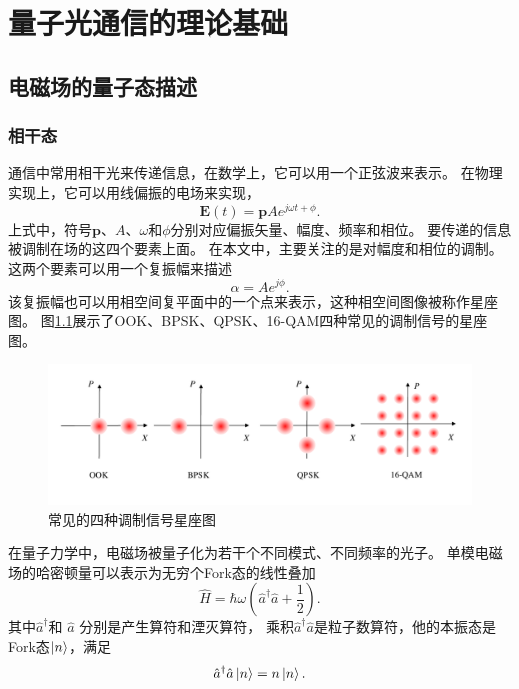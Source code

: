 \chapter{量子光通信的理论基础}

\section{电磁场的量子态描述}
\subsection{相干态}
通信中常用相干光来传递信息，在数学上，它可以用一个正弦波来表示。
在物理实现上，它可以用线偏振的电场来实现\cite{djordjevic2010fundamentals}，
\begin{equation}
\bm{E}(t) = \bm{p} A e^{j\omega t + \phi}.
\end{equation}
上式中，符号$\bm{p}$、$A$、$\omega$和$\phi$分别对应偏振矢量、幅度、频率和相位。
要传递的信息被调制在场的这四个要素上面。
在本文中，主要关注的是对幅度和相位的调制。
这两个要素可以用一个复振幅来描述
\begin{equation}
\alpha = A e^{j\phi}.
\end{equation}
该复振幅也可以用相空间复平面中的一个点来表示，这种相空间图像被称作星座图。
图\ref{fig:signals}展示了OOK、BPSK、QPSK、16-QAM四种常见的调制信号的星座图。

\begin{figure}
\centering
  \includegraphics[width=\textwidth]{figures/chap2/signals}
  \caption{常见的四种调制信号星座图}
  \label{fig:signals}
\end{figure}

在量子力学中，电磁场被量子化为若干个不同模式、不同频率的光子\cite{gerry2005introductory,helstrom1976quantum,mandel1995optical}。
单模电磁场的哈密顿量可以表示为无穷个Fork态的线性叠加
\begin{equation}
\hat{H} = \hbar \omega (\hat{a}^\dagger \hat{a} + \frac{1}{2}).
\end{equation}
其中$\hat{a}^\dagger$和 $\hat{a}$ 分别是产生算符和湮灭算符，
乘积$\hat{a}^\dagger \hat{a}$是粒子数算符，他的本振态是Fork态$\ket{n}$，满足
\begin{equation}
\hat{a}^\dagger \hat{a} \ket{n} = n \ket{n}.
\end{equation}


